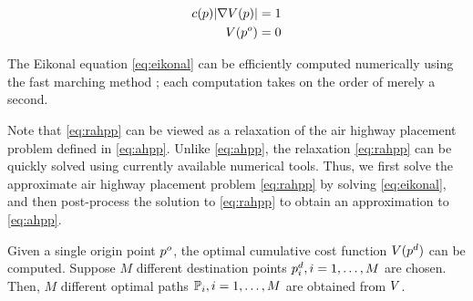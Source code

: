 \begin{equation}
\label{eq:eikonal}
\begin{aligned}
c(p)|\nabla V(p)| &= 1 \\
V(p^o) &= 0
\end{aligned}
\end{equation}

The Eikonal equation \eqref{eq:eikonal} can be efficiently computed numerically using the fast marching method \cite{Sethian96}; each computation takes on the order of merely a second.

Note that \eqref{eq:rahpp} can be viewed as a relaxation of the air highway placement problem defined in \eqref{eq:ahpp}. Unlike \eqref{eq:ahpp}, the relaxation \eqref{eq:rahpp} can be quickly solved using currently available numerical tools. Thus, we first solve the approximate air highway placement problem \eqref{eq:rahpp} by solving \eqref{eq:eikonal}, and then post-process the solution to \eqref{eq:rahpp} to obtain an approximation to \eqref{eq:ahpp}.

Given a single origin point $p^o$, the optimal cumulative cost function $V(p^d)$ can be computed. Suppose $M$ different destination points $p^d_i,i=1,\ldots,M$ are chosen. Then, $M$ different optimal paths $\mathbb{P}_i,i=1,\ldots,M$ are obtained from $V$. 